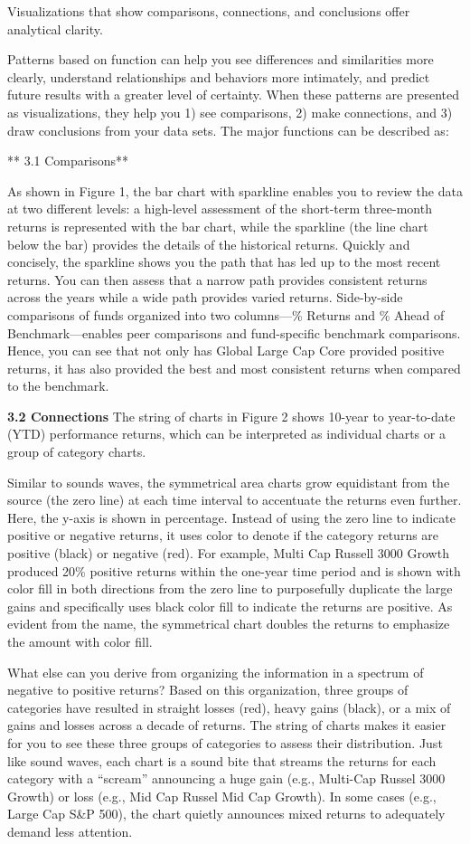 \documentclass[]{book}
\theoremstyle{definition}
\theoremstyle{definition}
\theoremstyle{definition}
\theoremstyle{remark}
\begin{document}
Visualizations that show comparisons, connections, and conclusions offer
analytical clarity.

Patterns based on function can help you see differences and similarities
more clearly, understand relationships and behaviors more intimately,
and predict future results with a greater level of certainty. When these
patterns are presented as visualizations, they help you 1) see
comparisons, 2) make connections, and 3) draw conclusions from your data
sets. The major functions can be described as:

** 3.1 Comparisons**

As shown in Figure 1, the bar chart with sparkline enables you to review
the data at two different levels: a high-level assessment of the
short-term three-month returns is represented with the bar chart, while
the sparkline (the line chart below the bar) provides the details of the
historical returns. Quickly and concisely, the sparkline shows you the
path that has led up to the most recent returns. You can then assess
that a narrow path provides consistent returns across the years while a
wide path provides varied returns. Side-by-side comparisons of funds
organized into two columns---\% Returns and \% Ahead of
Benchmark---enables peer comparisons and fund-specific benchmark
comparisons. Hence, you can see that not only has Global Large Cap Core
provided positive returns, it has also provided the best and most
consistent returns when compared to the benchmark.

\textbf{3.2 Connections} The string of charts in Figure 2 shows 10-year
to year-to-date (YTD) performance returns, which can be interpreted as
individual charts or a group of category charts.

Similar to sounds waves, the symmetrical area charts grow equidistant
from the source (the zero line) at each time interval to accentuate the
returns even further. Here, the y-axis is shown in percentage. Instead
of using the zero line to indicate positive or negative returns, it uses
color to denote if the category returns are positive (black) or negative
(red). For example, Multi Cap Russell 3000 Growth produced 20\% positive
returns within the one-year time period and is shown with color fill in
both directions from the zero line to purposefully duplicate the large
gains and specifically uses black color fill to indicate the returns are
positive. As evident from the name, the symmetrical chart doubles the
returns to emphasize the amount with color fill.

What else can you derive from organizing the information in a spectrum
of negative to positive returns? Based on this organization, three
groups of categories have resulted in straight losses (red), heavy gains
(black), or a mix of gains and losses across a decade of returns. The
string of charts makes it easier for you to see these three groups of
categories to assess their distribution. Just like sound waves, each
chart is a sound bite that streams the returns for each category with a
``scream'' announcing a huge gain (e.g., Multi-Cap Russel 3000 Growth)
or loss (e.g., Mid Cap Russel Mid Cap Growth). In some cases (e.g.,
Large Cap S\&P 500), the chart quietly announces mixed returns to
adequately demand less attention.
\end{document}
